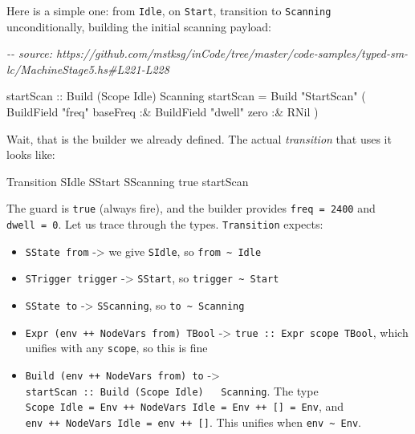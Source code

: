 \documentclass[]{article}
\newenvironment{Shaded}{}{}
\newcommand{\CommentTok}[1]{\textcolor[rgb]{0.38,0.63,0.69}{\textit{#1}}}
\newcommand{\DataTypeTok}[1]{\textcolor[rgb]{0.56,0.13,0.00}{#1}}
\newcommand{\NormalTok}[1]{#1}
\newcommand{\OperatorTok}[1]{\textcolor[rgb]{0.40,0.40,0.40}{#1}}
\newcommand{\OtherTok}[1]{\textcolor[rgb]{0.00,0.44,0.13}{#1}}
\newcommand{\StringTok}[1]{\textcolor[rgb]{0.25,0.44,0.63}{#1}}
\begin{document}
Here is a simple one: from \texttt{Idle}, on \texttt{Start}, transition to
\texttt{Scanning} unconditionally, building the initial scanning payload:

\begin{Shaded}
\begin{Highlighting}[]
\CommentTok{{-}{-} source: https://github.com/mstksg/inCode/tree/master/code{-}samples/typed{-}sm{-}lc/MachineStage5.hs\#L221{-}L228}

\OtherTok{startScan ::} \DataTypeTok{Build}\NormalTok{ (}\DataTypeTok{Scope} \DataTypeTok{Idle}\NormalTok{) }\DataTypeTok{Scanning}
\NormalTok{startScan }\OtherTok{=}
  \DataTypeTok{Build}
    \StringTok{"StartScan"}
\NormalTok{    ( }\DataTypeTok{BuildField} \StringTok{"freq"}\NormalTok{ baseFreq}
        \OperatorTok{:\&} \DataTypeTok{BuildField} \StringTok{"dwell"}\NormalTok{ zero}
        \OperatorTok{:\&} \DataTypeTok{RNil}
\NormalTok{    )}
\end{Highlighting}
\end{Shaded}

Wait, that is the builder we already defined. The actual \emph{transition} that
uses it looks like:

\begin{Shaded}
\begin{Highlighting}[]
\DataTypeTok{Transition} \DataTypeTok{SIdle} \DataTypeTok{SStart} \DataTypeTok{SScanning}\NormalTok{ true startScan}
\end{Highlighting}
\end{Shaded}

The guard is \texttt{true} (always fire), and the builder provides
\texttt{freq\ =\ 2400} and \texttt{dwell\ =\ 0}. Let us trace through the types.
\texttt{Transition} expects:

\begin{itemize}
\tightlist
\item
  \texttt{SState\ from} -\textgreater{} we give \texttt{SIdle}, so
  \texttt{from\ \textasciitilde{}\ Idle}
\item
  \texttt{STrigger\ trigger} -\textgreater{} \texttt{SStart}, so
  \texttt{trigger\ \textasciitilde{}\ Start}
\item
  \texttt{SState\ to} -\textgreater{} \texttt{SScanning}, so
  \texttt{to\ \textasciitilde{}\ Scanning}
\item
  \texttt{Expr\ (env\ ++\ NodeVars\ from)\ TBool} -\textgreater{}
  \texttt{true\ ::\ Expr\ scope\ TBool}, which unifies with any \texttt{scope},
  so this is fine
\item
  \texttt{Build\ (env\ ++\ NodeVars\ from)\ to} -\textgreater{}
  \texttt{startScan\ ::\ Build\ (Scope\ Idle)\ \ \ Scanning}. The type
  \texttt{Scope\ Idle\ =\ Env\ ++\ NodeVars\ Idle\ =\ Env\ ++\ {[}{]}\ =\ Env},
  and \texttt{env\ ++\ NodeVars\ Idle\ =\ env\ ++\ {[}{]}}. This unifies when
  \texttt{env\ \textasciitilde{}\ Env}.
\end{itemize}
\end{document}
